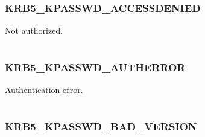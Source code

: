 \documentclass[letterpaper,10pt,english]{sphinxmanual}
\begin{document}
\subsubsection{KRB5\_KPASSWD\_ACCESSDENIED}
\label{appdev/refs/macros/KRB5_KPASSWD_ACCESSDENIED:krb5-kpasswd-accessdenied}\label{appdev/refs/macros/KRB5_KPASSWD_ACCESSDENIED:krb5-kpasswd-accessdenied-data}\label{appdev/refs/macros/KRB5_KPASSWD_ACCESSDENIED::doc}

\begin{fulllineitems}
\label{appdev/refs/macros/KRB5_KPASSWD_ACCESSDENIED:KRB5_KPASSWD_ACCESSDENIED}
\end{fulllineitems}


Not authorized.

\begin{tabulary}{\linewidth}{|L|L|}
\hline

 & 
\\
\hline\end{tabulary}



\subsubsection{KRB5\_KPASSWD\_AUTHERROR}
\label{appdev/refs/macros/KRB5_KPASSWD_AUTHERROR:krb5-kpasswd-autherror-data}\label{appdev/refs/macros/KRB5_KPASSWD_AUTHERROR:krb5-kpasswd-autherror}\label{appdev/refs/macros/KRB5_KPASSWD_AUTHERROR::doc}

\begin{fulllineitems}
\label{appdev/refs/macros/KRB5_KPASSWD_AUTHERROR:KRB5_KPASSWD_AUTHERROR}
\end{fulllineitems}


Authentication error.

\begin{tabulary}{\linewidth}{|L|L|}
\hline

 & 
\\
\hline\end{tabulary}



\subsubsection{KRB5\_KPASSWD\_BAD\_VERSION}
\label{appdev/refs/macros/KRB5_KPASSWD_BAD_VERSION:krb5-kpasswd-bad-version-data}\label{appdev/refs/macros/KRB5_KPASSWD_BAD_VERSION:krb5-kpasswd-bad-version}\label{appdev/refs/macros/KRB5_KPASSWD_BAD_VERSION::doc}
\end{document}
